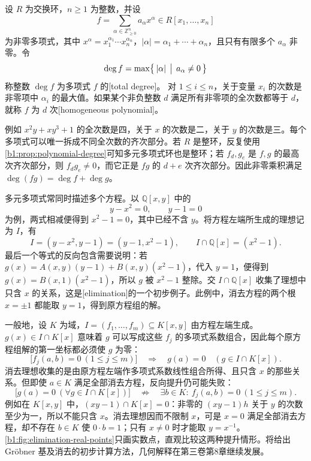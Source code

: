 \begin{definition}\label{b1:def:multivariate-degree}
	设 \(R\) 为交换环，\(n\geq1\) 为整数，并设
	\[
		f=\sum_{\alpha\in\mathbb Z_{\geq0}^n}a_\alpha x^\alpha \in R[x_1,\ldots,x_n]
	\]
	为非零多项式，其中 \(x^\alpha=x_1^{\alpha_1}\cdots x_n^{\alpha_n}\)，\(|\alpha|=\alpha_1+\cdots+\alpha_n\)，且只有有限多个 \(a_\alpha\) 非零。令
	\[
		\deg f=\max\bigl\{\,|\alpha|\,\bigm|\,a_\alpha\ne0\,\bigr\}
	\]
	称整数 \(\deg f\) 为多项式 \(f\) 的[total degree]。 对 \(1\leq i\leq n\)，关于变量 \(x_i\) 的次数是非零项中 \(\alpha_i\) 的最大值。如果某个非负整数 \(d\) 满足所有非零项的全次数都等于 \(d\)，就称 \(f\) 为 \(d\) 次[homogeneous polynomial]。
\end{definition}

例如 \(x^2y+xy^3+1\) 的全次数是四，关于 \(x\) 的次数是二，关于 \(y\) 的次数是三。每个多项式可以唯一拆成不同全次数的齐次部分。若 \(R\) 是整环，反复使用\cref{b1:prop:polynomial-degree}可知多元多项式环也是整环；若 \(f_d,g_e\) 是 \(f,g\) 的最高次齐次部分，则 \(f_dg_e\ne0\)，而它正是 \(fg\) 的 \(d+e\) 次齐次部分。因此非零乘积满足 \(\deg(fg)=\deg f+\deg g\)。

\ProseParagraphBreak
多元多项式常同时描述多个方程。以 \(\mathbb Q[x,y]\) 中的
\[
	y-x^2=0,\qquad y-1=0
\]
为例，两式相减便得到 \(x^2-1=0\)，其中已经不含 \(y\)。将方程左端所生成的理想记为 \(I\)，有
\[
	I=(y-x^2,y-1)=(y-1,x^2-1),\qquad I\cap\mathbb Q[x]=(x^2-1).
\]
最后一个等式的反向包含需要说明：若 \(g(x)=A(x,y)(y-1)+B(x,y)(x^2-1)\)，代入 \(y=1\)，便得到 \(g(x)=B(x,1)(x^2-1)\)，所以 \(g\) 被 \(x^2-1\) 整除。交 \(I\cap\mathbb Q[x]\) 收集了理想中只含 \(x\) 的关系，这是[elimination]的一个初步例子。此例中，消去方程的两个根 \(x=\pm1\) 都能取 \(y=1\)，得到原方程组的解。

\ProseParagraphBreak
一般地，设 \(K\) 为域，\(I=(f_1,\ldots,f_m)\subseteq K[x,y]\) 由方程左端生成。\(g(x)\in I\cap K[x]\) 意味着 \(g\) 可以写成这些 \(f_j\) 的多项式系数组合，因此每个原方程组解的第一坐标都必须使 \(g\) 为零：
\[
	\bigl[f_j(a,b)=0\ (1\le j\le m)\bigr] \quad\Longrightarrow\quad g(a)=0\quad(g\in I\cap K[x]).
\]
消去理想收集的是由原方程左端作多项式系数线性组合所得、且只含 \(x\) 的那些关系。但即使 \(a\in K\) 满足全部消去方程，反向提升仍可能失败：
\[
	\bigl[g(a)=0\ (\forall g\in I\cap K[x])\bigr] \quad\not\Longrightarrow\quad \exists b\in K:\ f_j(a,b)=0\ (1\le j\le m).
\]
例如在 \(K[x,y]\) 中，\((xy-1)\cap K[x]=0\)：非零的 \((xy-1)h\) 关于 \(y\) 的次数至少为一，所以不能只含 \(x\)。消去理想因而不限制 \(x\)，可是 \(x=0\) 满足全部消去方程，却不存在 \(b\in K\) 使 \(0\cdot b=1\)；只有 \(x\ne0\) 时才能取 \(y=x^{-1}\)。\cref{b1:fig:elimination-real-points}只画实数点，直观比较这两种提升情形。将给出 Gröbner 基及消去的初步计算方法，几何解释在第三卷第8章继续发展。

